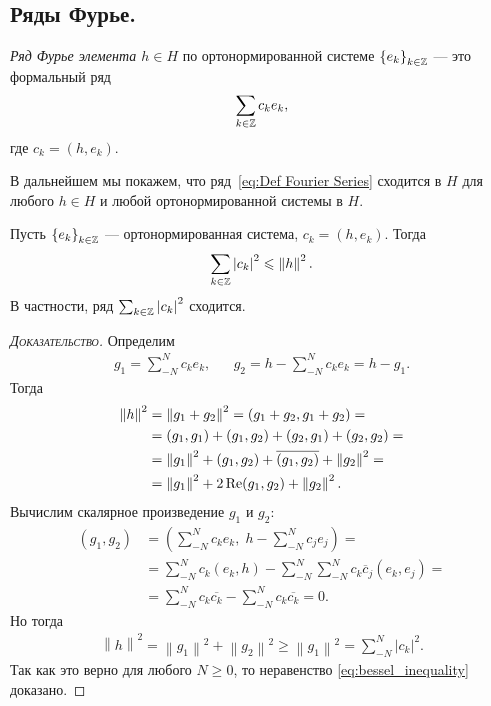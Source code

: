 \documentclass[../complex-analysis.tex]{subfiles}
\begin{document}
\subsection{Ряды Фурье.}

\begin{df}
 \textit{Ряд Фурье элемента $ h \in H $} по ортонормированной системе $ \left\{e_k\right\}_{k \in \mathbb{Z}}  $ --- это формальный ряд
 \begin{align}
  \label{eq:Def Fourier Series}
  \sum_{k\in\mathbb{Z}} c_ke_k, 
 \end{align} где $c_k = (h,e_k)$.
\end{df}
\begin{remrk*}
 В дальнейшем мы покажем, что ряд~\eqref{eq:Def Fourier Series} сходится в $ H $ для любого $ h \in H $ и любой ортонормированной системы в $ H $.
\end{remrk*}

\begin{claim}
 Пусть $ \left\{e_k\right\}_{k \in \mathbb{Z}}  $ --- ортонормированная система, $ c_k = (h,e_k) $. Тогда 
 \begin{align}
  \label{eq:bessel_inequality}
  \sum_{k \in\mathbb{Z}} \left| c_k \right|^{2} \leqslant \left\| h \right\|^{2}.
 \end{align} В частности, ряд $ \sum_{k \in \mathbb{Z}} \left| c_k \right|^{2} $ сходится.
\end{claim}
\begin{proof}[\normalfont\textsc{Доказательство}]
 Определим
 \begin{align*}
  g_1 = \sum_{-N}^{N}c_ke_k, && g_2 = h - \sum_{-N}^{N}c_ke_k = h - g_1.
 \end{align*} Тогда
 \begin{align*}
  \left\| h \right\|^{2} &= \left\| g_1 + g_2 \right\|^{2} = (g_1+g_2,g_1+g_2) = \\
  &= (g_1,g_1) + (g_1,g_2) + (g_2,g_1) + (g_2,g_2) = \\
  &= \left\| g_1 \right\|^{2} + (g_1, g_2) + \overline{(g_1,g_2)} + \left\| g_2 \right\|^{2} = \\
  &= \left\| g_1 \right\|^{2} + 2 \operatorname{Re} (g_1,g_2) + \left\| g_2 \right\|^{2}.
 \end{align*}
 Вычислим скалярное произведение $ g_1 $ и $ g_2 $:
 \begin{align*}
  (g_1,g_2) &= \left( \sum_{-N}^{N}c_ke_k,\; h - \sum_{-N}^{N} c_je_j \right) = \\
  &=  \sum_{-N}^{N}c_k(e_k,h)  - \sum_{-N}^{N} \sum_{-N}^{N} c_k \overline c_j (e_k, e_j) = \\
  &= \sum_{-N}^{N} c_k \overline{c_k} - \sum_{-N}^{N}c_k \overline{c_k} = 0.
 \end{align*} Но тогда
 \begin{align*}
  \left\| h \right\|^{2} = \left\| g_1 \right\|^{2} + \left\| g_2 \right\|^{2} \geqslant \left\| g_1 \right\|^{2} = \sum_{-N}^{N}\left| c_k \right|^{2}.
 \end{align*} Так как это верно для любого $ N \geqslant 0 $, то неравенство \eqref{eq:bessel_inequality} доказано.
\end{proof}
\end{document}
